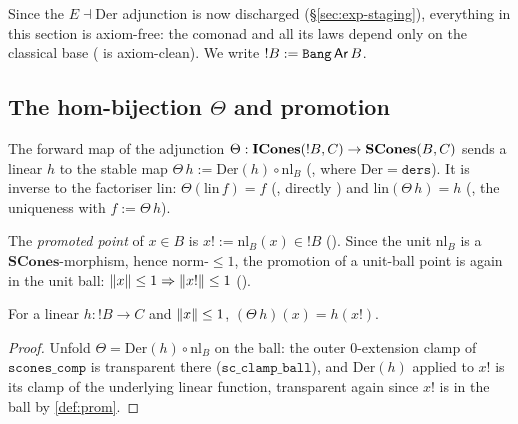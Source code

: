 Since the $E \dashv \mathrm{Der}$ adjunction is now discharged
(\S\ref{sec:exp-staging}), everything in this section is axiom-free:
the comonad and all its laws depend only on the classical base
( is axiom-clean). We write
$\mathord{!}B := \texttt{Bang}\,\mathsf{Ar}\,B$.

\subsection{The hom-bijection \texorpdfstring{$\Theta$}{X} and promotion}\label{sec:theta}

\begin{definition}\label{def:theta}
\rocqok{}
The forward map of the adjunction $\Theta : \mathbf{ICones}(\mathord{!}B, C)
\to \mathbf{SCones}(B, C)$ sends a linear $h$ to the stable map
$\Theta\,h := \mathrm{Der}(h) \circ \mathrm{nl}_B$
(, where $\mathrm{Der} = \texttt{ders}$).
It is inverse to the factoriser $\mathrm{lin}$: $\Theta(\mathrm{lin}\,f)
= f$ (, directly
) and
$\mathrm{lin}(\Theta\,h) = h$ (, the
uniqueness  with
$f := \Theta\,h$).
\end{definition}

\begin{definition}\label{def:prom}
\rocqok{}
The \emph{promoted point} of $x \in B$ is $x! := \mathrm{nl}_B(x) \in
\mathord{!}B$ (). Since the unit
$\mathrm{nl}_B$ is a $\mathbf{SCones}$-morphism, hence norm-$\leq 1$,
the promotion of a unit-ball point is again in the unit ball:
$\lVert x \rVert \leq 1 \Rightarrow \lVert x! \rVert \leq 1$
().
\end{definition}

\begin{lemma}\label{lem:theta-prom}
\rocqok{}
For a linear $h : \mathord{!}B \to C$ and $\lVert x \rVert \leq 1$,
$(\Theta\,h)(x) = h(x!)$.
\end{lemma}

\begin{proof}
Unfold $\Theta = \mathrm{Der}(h) \circ \mathrm{nl}_B$ on the ball: the
outer $0$-extension clamp of $\texttt{scones\_comp}$ is transparent
there ($\texttt{sc\_clamp\_ball}$), and $\mathrm{Der}(h)$ applied to
$x!$ is its clamp of the underlying linear function, transparent again
since $x!$ is in the ball by \autoref{def:prom}.
\end{proof}

